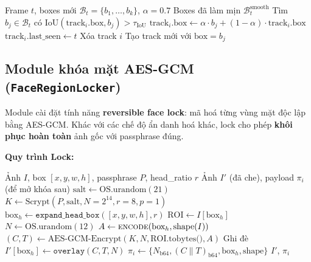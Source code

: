 \begin{algorithm}[H]
\caption{Làm mịn bounding box theo thời gian (EMA)}
\begin{algorithmic}[1]
\Require Frame $t$, boxes mới $\mathcal{B}_t = \{b_1, \ldots, b_k\}$, $\alpha = 0.7$
\Ensure Boxes đã làm mịn $\mathcal{B}_t^{\text{smooth}}$
    \State Tìm $b_j \in \mathcal{B}_t$ có $\text{IoU}(\text{track}_i.\text{box}, b_j) > \tau_{\text{IoU}}$
        \State $\text{track}_i.\text{box} \leftarrow \alpha \cdot b_j + (1-\alpha) \cdot \text{track}_i.\text{box}$
        \State $\text{track}_i.\text{last\_seen} \leftarrow t$
    \Else
            \State Xóa track $i$
        \EndIf
    \EndIf
\EndFor
{}
    \State Tạo track mới với $\text{box} = b_j$
\EndFor
\end{algorithmic}
\end{algorithm}

\subsection{Module khóa mặt AES-GCM (\texttt{FaceRegionLocker})}
\label{subsec:facelockmod}

Module  cài đặt tính năng \textbf{reversible face lock}: mã hoá từng vùng mặt độc lập bằng AES-GCM. Khác với các chế độ ẩn danh hoá khác, lock cho phép \textbf{khôi phục hoàn toàn} ảnh gốc với passphrase đúng.

\medskip
\textbf{Quy trình Lock:}

\begin{algorithm}[H]
\caption{Khóa khuôn mặt thứ $i$ (FaceRegionLocker.lock)}
\begin{algorithmic}[1]
\Require Ảnh $I$, box $[x,y,w,h]$, passphrase $P$, head\_ratio $r$
\Ensure Ảnh $I'$ (đã che), payload $\pi_i$ (để mở khóa sau)
\State $\text{salt} \leftarrow \text{OS.urandom}(21)$ 
\State $K \leftarrow \text{Scrypt}(P, \text{salt}, N=2^{14}, r=8, p=1)$ 
\State $\text{box}_h \leftarrow \texttt{expand\_head\_box}([x,y,w,h], r)$
\State $\text{ROI} \leftarrow I[\text{box}_h]$ 
\State $N \leftarrow \text{OS.urandom}(12)$ 
\State $A \leftarrow \textsc{encode}(\text{box}_h, \text{shape}(I))$ 
\State $(C, T) \leftarrow \text{AES-GCM-Encrypt}(K, N, \text{ROI.tobytes()}, A)$
\State Ghi đè $I'[\text{box}_h] \leftarrow \texttt{overlay}(C, T, N)$ 
\State $\pi_i \leftarrow \{N_{\text{b64}}, (C\|T)_{\text{b64}}, \text{box}_h, \text{shape}\}$
\Return $I'$, $\pi_i$
\end{algorithmic}
\end{algorithm}

